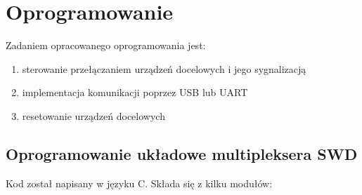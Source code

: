 \chapter{Oprogramowanie }

Zadaniem opracowanego oprogramowania jest:
\begin{enumerate}
    \item sterowanie przełączaniem urządzeń docelowych i jego sygnalizacją
    \item implementacja komunikacji poprzez USB lub UART
    \item resetowanie urządzeń docelowych
\end{enumerate}

\section {Oprogramowanie układowe multipleksera SWD}
Kod został napisany w języku C.
Składa się z kilku modułów:
